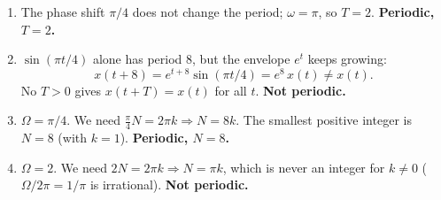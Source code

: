 \documentclass[12pt]{article}
\begin{document}
\begin{enumerate}
\begin{enumerate}
    \item The phase shift $\pi/4$ does not change the period; $\omega = \pi$, so $T = 2$.
    \textbf{Periodic, $T = 2$.}

    \item $\sin(\pi t/4)$ alone has period $8$, but the envelope $e^t$ keeps growing:
    \[x(t+8) = e^{t+8}\sin(\pi t/4) = e^{8}\,x(t) \neq x(t).\]
    No $T>0$ gives $x(t+T) = x(t)$ for all $t$. \textbf{Not periodic.}

    \item $\Omega = \pi/4$. We need $\frac{\pi}{4}N = 2\pi k \Rightarrow N = 8k$.
    The smallest positive integer is $N = 8$ (with $k=1$). \textbf{Periodic, $N = 8$.}

    \item $\Omega = 2$. We need $2N = 2\pi k \Rightarrow N = \pi k$, which is never an integer for $k \neq 0$
    ($\Omega/2\pi = 1/\pi$ is irrational). \textbf{Not periodic.}
\end{enumerate}

\end{enumerate}
\end{document}
